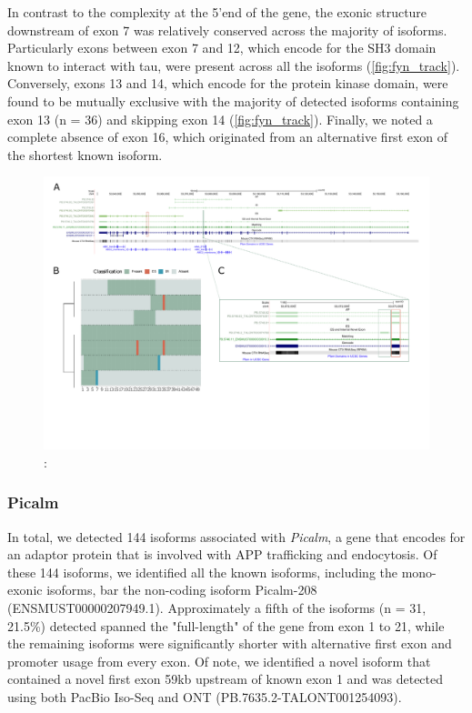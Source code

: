 In contrast to the complexity at the 5'end of the gene, the exonic structure downstream of exon 7 was relatively conserved across the majority of isoforms. Particularly exons between exon 7 and 12, which encode for the SH3 domain known to interact with tau, were present across all the isoforms (\cref{fig:fyn_track}). Conversely, exons 13 and 14,  which encode for the protein kinase domain, were found to be mutually exclusive with the majority of detected isoforms containing exon 13 (n = 36) and skipping exon 14 (\cref{fig:fyn_track}). Finally, we noted a complete absence of exon 16, which originated from an alternative first exon of the shortest known isoform. 

\begin{landscape}
	\begin{figure}[htp]
		\begin{center}
			\includegraphics[page=7,trim={0 1cm 0 0},scale = 0.85]{Figures/TargetGenes_Annotation_Landscape.pdf}
		\end{center}
		\captionsetup{width=0.95\textwidth}
		\caption[RNA-Seq defined transcriptome]%
		{\textbf{}: }   
		\label{fig:fyn}
	\end{figure}
\end{landscape} 

\newpage
\subsubsection{Picalm}
In total, we detected 144 isoforms associated with \textit{Picalm}, a gene that encodes for an adaptor protein that is involved with APP trafficking and endocytosis. Of these 144 isoforms, we identified all the known isoforms, including the mono-exonic isoforms, bar the non-coding isoform Picalm-208	 (ENSMUST00000207949.1). Approximately a fifth of the isoforms (n = 31, 21.5\%) detected spanned the "full-length" of the gene from exon 1 to 21, while the remaining isoforms were significantly shorter with alternative first exon and promoter usage from every exon. Of note, we identified a novel isoform that contained a novel first exon 59kb upstream of known exon 1 and was detected using both PacBio Iso-Seq and ONT (PB.7635.2-TALONT001254093).


